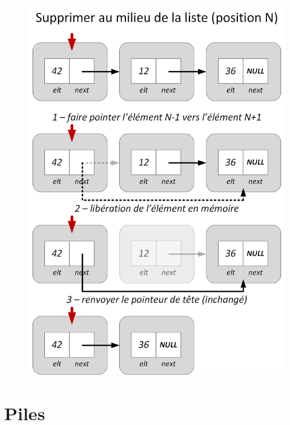 \documentclass[11pt,a4paper]{article}
\begin{document}
\begin{figure}[ht!]
\centering
\centerline{   %
\includegraphics[scale=0.85]{img/listes/Listes_Pointeurs_4_3_suppression_milieu.png}
}
\end{figure}

\vfillLast


\newpage


\section{Piles}
\end{document}
